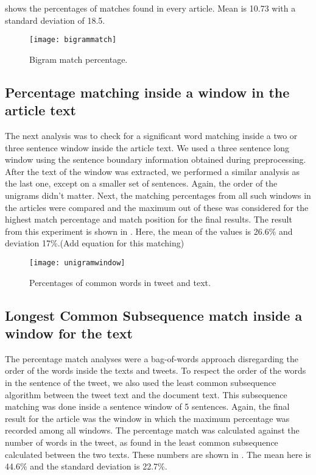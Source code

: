  shows the percentages of matches found in every article. Mean is 10.73 with a standard deviation of 18.5.

\begin{figure}[htbp]
\centering
\texttt{[image: bigrammatch]}
\caption{Bigram match percentage.}
\label{fig:bigrammatch}
\end{figure}

\subsection{Percentage matching inside a window in the article text}

The next analysis was to check for a significant word matching inside a two or three sentence window inside the article text. We used a three sentence long window using the sentence boundary information obtained during preprocessing. After the text of the window was extracted, we performed a similar analysis as the last one, except on a smaller set of sentences. Again, the order of the unigrams didn't matter. Next, the matching percentages from all such windows in the articles were compared and the maximum out of these was considered for the highest match percentage and match position for the final results. The result from this experiment is shown in . Here, the mean of the values is 26.6\% and deviation 17\%.\improvement(Add equation for this matching)

\begin{figure}[htbp]
\centering
\texttt{[image: unigramwindow]}
\caption{Percentages of common words in tweet and text.}
\label{fig:unigramwindow}
\end{figure}

\subsection{Longest Common Subsequence match inside a window for the text}

The percentage match analyses were a bag-of-words approach disregarding the order of the words inside the texts and tweets. To respect the order of the words in the sentence of the tweet, we also used the least common subsequence algorithm between the tweet text and the document text. This subsequence matching was done inside a sentence window of 5 sentences. Again, the final result for the article was the window in which the maximum percentage was recorded among all windows. The percentage match was calculated against the number of words in the tweet, as found in the least common subsequence calculated between the two texts. These numbers are shown in . The mean here is 44.6\% and the standard deviation is 22.7\%. 

